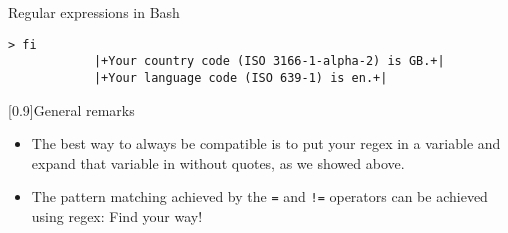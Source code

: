 \begin{frame}[fragile]{Regular expressions in Bash}
\begin{onlyenv}
\begin{lstlisting}[style=MyBash, style=oddnumbers, style=smaller]
            > fi
            |+Your country code (ISO 3166-1-alpha-2) is GB.+|
            |+Your language code (ISO 639-1) is en.+|
        \end{lstlisting}
        \begin{varblock*}{}[0.9\textwidth]{General remarks}
            \begin{itemize}
                \item The best way to always be compatible is to put your regex in a variable and expand that variable in \bash{[[} without quotes, as we showed above.
                \item The pattern matching achieved by the \texttt{=} and \texttt{!=} operators can be achieved using regex: \alert{Find your way!}
            \end{itemize}
        \end{varblock*}
    \end{onlyenv}
\end{frame}











